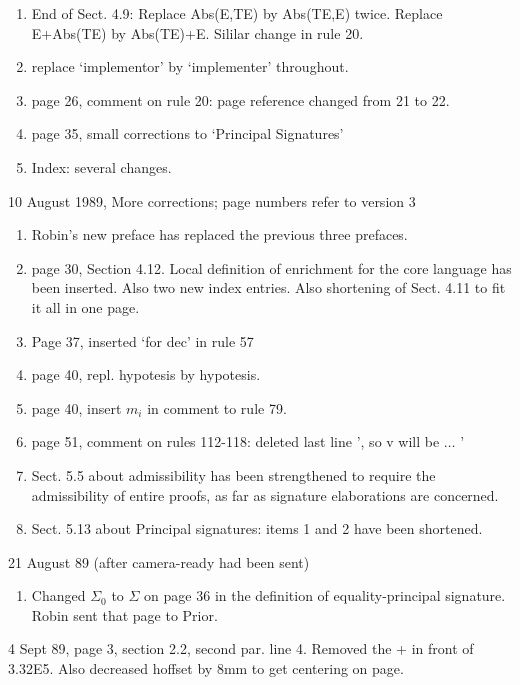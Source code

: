 \begin{description}
\begin{enumerate}
\item End of Sect. 4.9: Replace Abs(E,TE) by Abs(TE,E) twice. Replace E+Abs(TE)
by Abs(TE)+E. Sililar change in rule 20.
\item replace `implementor' by `implementer' throughout.
\item page 26, comment on rule 20:  page reference changed from 21 to 22.
\item page 35, small corrections to `Principal Signatures'
\item Index: several changes.
\end{enumerate}
\item{10 August 1989, More corrections; page numbers refer to version 3}
\begin{enumerate}
\item Robin's new preface has replaced the previous three prefaces.
\item page 30, Section 4.12. Local definition of enrichment for
the core language has been inserted. Also two new index entries.
Also shortening of Sect. 4.11 to fit it all in one page.
\item Page 37, inserted `for dec' in rule 57
\item page 40, repl. hypotesis by hypotesis.
\item page 40, insert $m_i$ in comment to rule 79.
\item page 51, comment on rules 112-118: deleted last line ', so v will be
$\ldots$  '
\item Sect. 5.5 about admissibility has been strengthened to require
the admissibility of entire proofs, as far as signature elaborations
are concerned.
\item Sect. 5.13 about Principal signatures: items 1 and 2 have
been shortened.
\end{enumerate}
\item 21 August 89 (after camera-ready had been sent)
\begin{enumerate}
\item Changed $\Sigma_0$ to $\Sigma$ on page 36 in the
definition of equality-principal signature. Robin sent that page
to Prior.
\end{enumerate}
\end{description}
\begin{description}
\item{4 Sept 89}, page 3, section 2.2, second par. line 4.  Removed the 
+ in front of 3.32E5. Also decreased hoffset by 8mm to get centering
on page.
\end{description}

